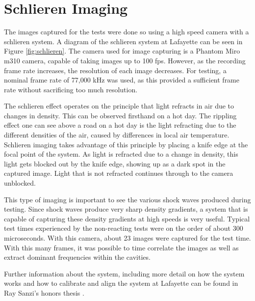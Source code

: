 
\section{Schlieren Imaging}

The images captured for the tests were done so using a high speed camera with a schlieren system. A diagram of the schlieren system at Lafayette can be seen in Figure \ref{fig:schlieren}. The camera used for image capturing is a Phantom Miro m310 camera, capable of taking images up to 100 fps. However, as the recording frame rate increases, the resolution of each image decreases. For testing, a nominal frame rate of 77,000 kHz was used, as this provided a sufficient frame rate without sacrificing too much resolution.

The schlieren effect operates on the principle that light refracts in air due to changes in density. This can be observed firsthand on a hot day. The rippling effect one can see above a road on a hot day is the light refracting due to the different densities of the air, caused by differences in local air temperature. Schlieren imaging takes advantage of this principle by placing a knife edge at the focal point of the system. As light is refracted due to a change in density, this light gets blocked out by the knife edge, showing up as a dark spot in the captured image. Light that is not refracted continues through to the camera unblocked. 

This type of imaging is important to see the various shock waves produced during testing. Since shock waves produce very sharp density gradients, a system that is capable of capturing these density gradients at high speeds is very useful. Typical test times experienced by the non-reacting tests were on the order of about 300 microseconds. With this camera, about 23 images were captured for the test time.  With this many frames, it was possible to time correlate the images as well as extract dominant frequencies within the cavities.

Further information about the system, including more detail on how the system works and how to calibrate and align the system at Lafayette can be found in Ray Sanzi's honors thesis \cite{Sanzi2016}.



